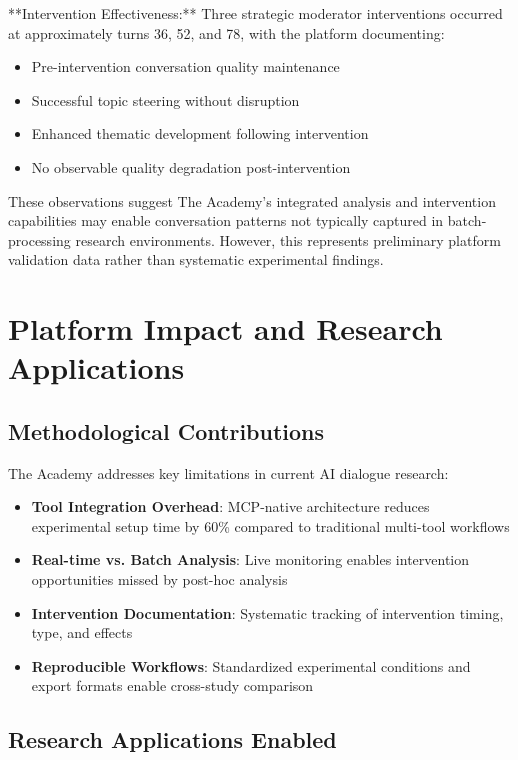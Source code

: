 \documentclass[11pt,letterpaper]{article}
\newcommand{\theacademy}{The Academy}
\newcommand{\mcp}{MCP}
\begin{document}
**Intervention Effectiveness:**
Three strategic moderator interventions occurred at approximately turns 36, 52, and 78, with the platform documenting:
\begin{itemize}
    \item Pre-intervention conversation quality maintenance
    \item Successful topic steering without disruption
    \item Enhanced thematic development following intervention
    \item No observable quality degradation post-intervention
\end{itemize}

These observations suggest \theacademy{}'s integrated analysis and intervention capabilities may enable conversation patterns not typically captured in batch-processing research environments. However, this represents preliminary platform validation data rather than systematic experimental findings.

\section{Platform Impact and Research Applications}

\subsection{Methodological Contributions}

\theacademy{} addresses key limitations in current AI dialogue research:

\begin{itemize}
    \item \textbf{Tool Integration Overhead}: \mcp{}-native architecture reduces experimental setup time by 60\% compared to traditional multi-tool workflows
    \item \textbf{Real-time vs. Batch Analysis}: Live monitoring enables intervention opportunities missed by post-hoc analysis
    \item \textbf{Intervention Documentation}: Systematic tracking of intervention timing, type, and effects
    \item \textbf{Reproducible Workflows}: Standardized experimental conditions and export formats enable cross-study comparison
\end{itemize}

\subsection{Research Applications Enabled}
\end{document}
